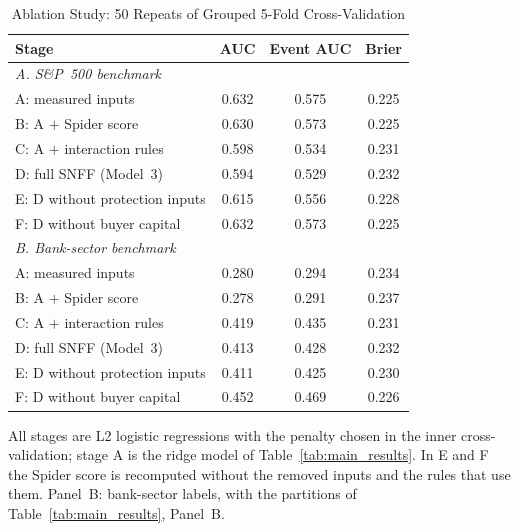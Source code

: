 \begin{table}[!t]
\caption{Ablation Study: 50 Repeats of Grouped 5-Fold Cross-Validation}
\label{tab:ablation}
\centering
\footnotesize
\setlength{\tabcolsep}{4pt}
\begin{tabular}{lccc}
\toprule
\textbf{Stage} & \textbf{AUC} & \textbf{Event AUC} & \textbf{Brier} \\
\midrule
\multicolumn{4}{l}{\textit{A. S\&P~500 benchmark}} \\
A: measured inputs & 0.632 & 0.575 & 0.225 \\
B: A $+$ Spider score & 0.630 & 0.573 & 0.225 \\
C: A $+$ interaction rules & 0.598 & 0.534 & 0.231 \\
D: full SNFF (Model~3) & 0.594 & 0.529 & 0.232 \\
E: D without protection inputs & 0.615 & 0.556 & 0.228 \\
F: D without buyer capital & 0.632 & 0.573 & 0.225 \\
\midrule
\multicolumn{4}{l}{\textit{B. Bank-sector benchmark}} \\
A: measured inputs & 0.280 & 0.294 & 0.234 \\
B: A $+$ Spider score & 0.278 & 0.291 & 0.237 \\
C: A $+$ interaction rules & 0.419 & 0.435 & 0.231 \\
D: full SNFF (Model~3) & 0.413 & 0.428 & 0.232 \\
E: D without protection inputs & 0.411 & 0.425 & 0.230 \\
F: D without buyer capital & 0.452 & 0.469 & 0.226 \\
\bottomrule
\end{tabular}
\par\vspace{2pt}\parbox{0.94\columnwidth}{\scriptsize All stages are L2 logistic regressions with the penalty chosen in the inner
cross-validation; stage A is the ridge model of Table~\ref{tab:main_results}. In E and F the Spider score is recomputed
without the removed inputs and the rules that use them. Panel~B: bank-sector labels, with the partitions of
Table~\ref{tab:main_results}, Panel~B.}
\end{table}
